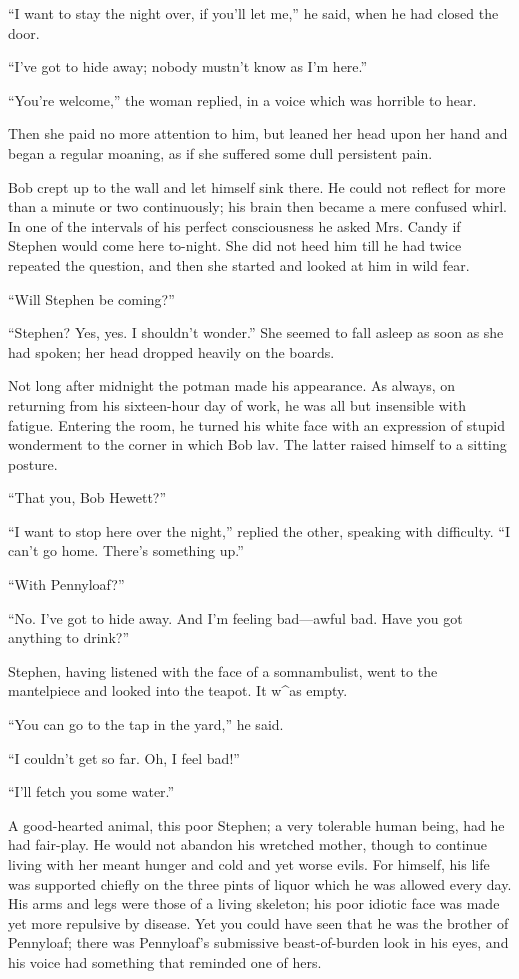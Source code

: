 ``I want to stay the night over, if you'll let me,'' he said, when he
had closed the door.

``I've got to hide away; nobody mustn't know as I'm here.''

``You're welcome,'' the woman replied, in a voice which was horrible to
hear.

{}Then she paid no more attention to him, but leaned her head upon her
hand and began a regular moaning, as if she suffered some dull
persistent pain.

Bob crept up to the wall and let himself sink there. He could not
reflect for more than a minute or two continuously; his brain then
became a mere confused whirl. In one of the intervals of his perfect
consciousness he asked Mrs. Candy if Stephen would come here to-night.
She did not heed him till he had twice repeated the question, and then
she started and looked at him in wild fear.

``Will Stephen be coming?''

``Stephen? Yes, yes. I shouldn't wonder.'' She seemed to fall asleep as
soon as she had spoken; her head dropped heavily on the boards.

Not long after midnight the potman made his appearance. As always, on
returning from his sixteen-hour day of work, he was all but insensible
with fatigue. Entering the room, he turned his white face with an
expression of stupid wonderment to the corner in which Bob lav. The
latter raised himself to a sitting posture.

{}``That you, Bob Hewett?''

``I want to stop here over the night,'' replied the other, speaking with
difficulty. ``I can't go home. There's something up.''

``With Pennyloaf?''

``No. I've got to hide away. And I'm feeling bad---awful bad. Have you
got anything to drink?''

Stephen, having listened with the face of a somnambulist, went to the
mantelpiece and looked into the teapot. It w\^{}as empty.

``You can go to the tap in the yard,'' he said.

``I couldn't get so far. Oh, I feel bad!''

``I'll fetch you some water.''

A good-hearted animal, this poor Stephen; a very tolerable human being,
had he had fair-play. He would not abandon his wretched mother, though
to continue living with her meant hunger and cold and yet worse evils.
For himself, his life was supported chiefly on the three pints of liquor
which he was allowed every day. His arms and legs were those of a living
skeleton; his poor idiotic face was made yet more repulsive by disease.
Yet you could have seen that he was the brother of Pennyloaf; there was
Pennyloaf's submissive {}beast-of-burden look in his eyes, and his voice
had something that reminded one of hers.

